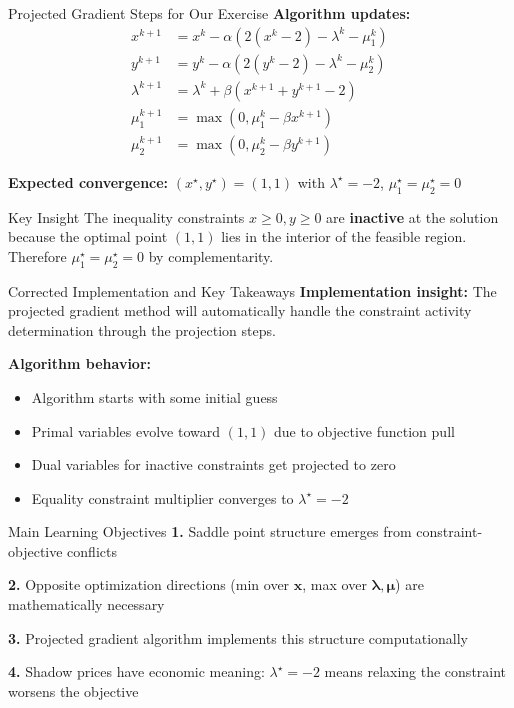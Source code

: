 \documentclass[aspectratio=1610]{beamer}
\begin{document}
\begin{frame}{Projected Gradient Steps for Our Exercise}
  \textbf{Algorithm updates:}
  \begin{align}
    x^{k+1} &= x^k - \alpha(2(x^k-2) - \lambda^k - \mu_1^k)\\
    y^{k+1} &= y^k - \alpha(2(y^k-2) - \lambda^k - \mu_2^k)\\
    \lambda^{k+1} &= \lambda^k + \beta(x^{k+1} + y^{k+1} - 2)\\
    \mu_1^{k+1} &= \max(0, \mu_1^k - \beta x^{k+1})\\
    \mu_2^{k+1} &= \max(0, \mu_2^k - \beta y^{k+1})
  \end{align}
  
  \vspace{0.3cm}
  \textbf{Expected convergence:} $(x^{\star}, y^{\star}) = (1, 1)$ with $\lambda^{\star} = -2$, $\mu_1^{\star} = \mu_2^{\star} = 0$
  
  \vspace{0.3cm}
  \begin{alertblock}{Key Insight}
    The inequality constraints $x \geq 0, y \geq 0$ are \textbf{inactive} at the solution because the optimal point $(1,1)$ lies in the interior of the feasible region. Therefore $\mu_1^{\star} = \mu_2^{\star} = 0$ by complementarity.
  \end{alertblock}
\end{frame}

\begin{frame}{Corrected Implementation and Key Takeaways}
  \textbf{Implementation insight:} The projected gradient method will automatically handle the constraint activity determination through the projection steps.
  
  \vspace{0.3cm}
  \textbf{Algorithm behavior:}
  \begin{itemize}
    \item Algorithm starts with some initial guess
    \item Primal variables evolve toward $(1,1)$ due to objective function pull
    \item Dual variables for inactive constraints get projected to zero
    \item Equality constraint multiplier converges to $\lambda^{\star} = -2$
  \end{itemize}
  
  \vspace{0.5cm}
  \begin{block}{Main Learning Objectives}
    \textbf{1.} Saddle point structure emerges from constraint-objective conflicts
    
    \textbf{2.} Opposite optimization directions (min over $\mathbf{x}$, max over $\boldsymbol{\lambda}, \boldsymbol{\mu}$) are mathematically necessary
    
    \textbf{3.} Projected gradient algorithm implements this structure computationally
    
    \textbf{4.} Shadow prices have economic meaning: $\lambda^{\star} = -2$ means relaxing the constraint worsens the objective
  \end{block}
\end{frame}
\end{document}
